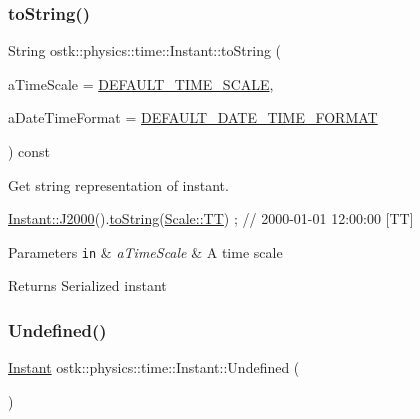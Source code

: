 \subsubsection{\texorpdfstring{to\+String()}{toString()}}
{\footnotesize\ttfamily String ostk\+::physics\+::time\+::\+Instant\+::to\+String (\begin{DoxyParamCaption}\item[{const \hyperlink{namespaceostk_1_1physics_1_1time_adf23d37bd8641fb76a0e98ab46a70df7}{Scale} \&}]{a\+Time\+Scale = {\ttfamily \hyperlink{_instant_8hpp_a83fe97f5695ec6cbf25b55bb0cf31a6e}{D\+E\+F\+A\+U\+L\+T\+\_\+\+T\+I\+M\+E\+\_\+\+S\+C\+A\+LE}},  }\item[{const \hyperlink{classostk_1_1physics_1_1time_1_1_date_time_a1d21d982b18bf56ed684fcf1cd97e092}{Date\+Time\+::\+Format} \&}]{a\+Date\+Time\+Format = {\ttfamily \hyperlink{_instant_8hpp_a29e15915855da5a5ac528ed12373dda4}{D\+E\+F\+A\+U\+L\+T\+\_\+\+D\+A\+T\+E\+\_\+\+T\+I\+M\+E\+\_\+\+F\+O\+R\+M\+AT}} }\end{DoxyParamCaption}) const}



Get string representation of instant. 


\begin{DoxyCode}
\hyperlink{classostk_1_1physics_1_1time_1_1_instant_a3f84d0c2d0b140326d3b172b54e3ffff}{Instant::J2000}().\hyperlink{classostk_1_1physics_1_1time_1_1_instant_ad2848890ee69709ed5540d1c8fa017e1}{toString}(\hyperlink{namespaceostk_1_1physics_1_1time_adf23d37bd8641fb76a0e98ab46a70df7adf1f3edb9115acb0a1e04209b7a9937b}{Scale::TT}) ; \textcolor{comment}{// 2000-01-01 12:00:00 [TT]}
\end{DoxyCode}



\begin{DoxyParams}[1]{Parameters}
\mbox{\tt in}  & {\em a\+Time\+Scale} & A time scale \\
\hline
\end{DoxyParams}
\begin{DoxyReturn}{Returns}
Serialized instant 
\end{DoxyReturn}
\mbox{\label{classostk_1_1physics_1_1time_1_1_instant_a0c95c97e9aa17863aecf8c9ebc821c0b}} 
\subsubsection{\texorpdfstring{Undefined()}{Undefined()}}
{\footnotesize\ttfamily \hyperlink{classostk_1_1physics_1_1time_1_1_instant}{Instant} ostk\+::physics\+::time\+::\+Instant\+::\+Undefined (\begin{DoxyParamCaption}{ }\end{DoxyParamCaption})\hspace{0.3cm}{\ttfamily [static]}}



